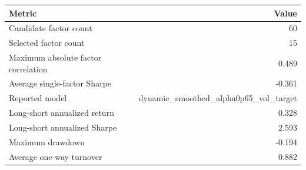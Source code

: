 \begin{tabular}{lr}
\toprule
Metric & Value \\
\midrule
Candidate factor count & 60 \\
Selected factor count & 15 \\
Maximum absolute factor correlation & 0.489 \\
Average single-factor Sharpe & -0.361 \\
Reported model & dynamic\_smoothed\_alpha0p65\_vol\_target \\
Long-short annualized return & 0.328 \\
Long-short annualized Sharpe & 2.593 \\
Maximum drawdown & -0.194 \\
Average one-way turnover & 0.882 \\
\bottomrule
\end{tabular}
